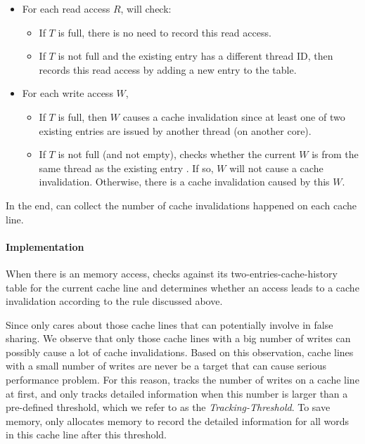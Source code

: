 \begin{itemize}
\item
  For each read access $R$, \cheetah{} will check: 
  \begin{itemize}
    \item
      If $T$ is full, there is no need to record this read access.
    \item
      If $T$ is not full and the existing entry has a different thread ID, 
      then \cheetah{} records this read access by adding a new entry to the table.
  \end{itemize}
\item
  For each write access $W$,  
  \begin{itemize}
    \item
      If $T$ is full, then $W$ causes a cache invalidation since at least one of two existing entries are issued by another thread (on another core).
    \item
      If $T$ is not full (and not empty),
      \cheetah{} checks whether the current $W$ is from the same thread as the existing entry . If
      so, $W$ will not cause a cache invalidation. Otherwise, there is a cache invalidation caused by this $W$.
  \end{itemize}
\end{itemize}

      
In the end, \cheetah{} can collect the number of cache invalidations happened on each cache line. 

\paragraph{Implementation} 

When there is an memory access, \Cheetah{} checks against its two-entries-cache-history table for the current cache line and determines whether an access leads to a cache invalidation according to the rule discussed above. 

Since \cheetah{} only cares about those cache lines that can potentially involve in false sharing. We observe that only those cache lines with a big number of writes can possibly cause a lot of cache invalidations. Based on this observation, cache lines with a small number of writes are never be a target that can cause serious performance problem. For this reason, \Cheetah{} tracks  the number of writes on a cache line at first, and only tracks detailed information when this number is larger than a pre-defined threshold, which we refer to as the {\it Tracking-Threshold}. To save memory, \cheetah{} only allocates memory to record the detailed information for all words in this cache line after this threshold.
 
